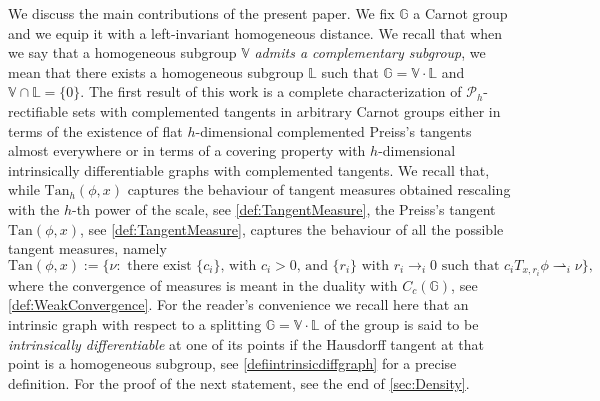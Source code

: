 \documentclass[10pt, a4paper,
oneside, headinclude,footinclude]{scrartcl}
\begin{document}
We discuss the main contributions of the present paper. We fix $\mathbb G$ a Carnot group and we equip it with a left-invariant homogeneous distance. We recall that when we say that a homogeneous subgroup $\mathbb V$ {\em admits a complementary subgroup}, we mean that there exists a homogeneous subgroup $\mathbb L$ such that $\mathbb G=\mathbb V\cdot \mathbb L$ and $\mathbb V\cap\mathbb L=\{0\}$. The first result of this work is a complete characterization of $\mathscr{P}_h$-rectifiable sets with complemented tangents in arbitrary Carnot groups either in terms of the existence of flat $h$-dimensional complemented Preiss's tangents almost everywhere or in terms of a covering property with $h$-dimensional intrinsically differentiable graphs with complemented tangents. We recall that, while $\mathrm{Tan}_h(\phi,x)$ captures the behaviour of tangent measures obtained rescaling with the $h$-th power of the scale, see \cref{def:TangentMeasure}, the Preiss's tangent $\mathrm{Tan}(\phi,x)$, see \cref{def:TangentMeasure}, captures the behaviour of all the possible tangent measures, namely 
$$
\mathrm{Tan}(\phi,x):=\{\nu:\,\,\text{there exist $\{c_i\}$, with $c_i>0$, and $\{r_i\}$ with $r_i\to _{i}0$ such that}\,\, c_iT_{x,r_i}\phi\rightharpoonup_{i} \nu\},
$$
where the convergence of measures is meant in the duality with $C_c(\mathbb G)$, see \cref{def:WeakConvergence}. For the reader's convenience we recall here that an intrinsic graph with respect to a splitting $\mathbb G=\mathbb V\cdot\mathbb L$ of the group is said to be {\em intrinsically differentiable} at one of its points if the Hausdorff tangent at that point is a homogeneous subgroup, see \cref{defiintrinsicdiffgraph} for a precise definition. For the proof of the next statement, see the end of \cref{sec:Density}.
\end{document}
